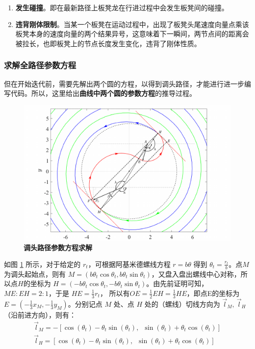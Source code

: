 \documentclass[zihao=-4, UTF8]{article}		%
\theoremstyle{MyLineTheoremStyle} %
\theoremstyle{MyBlockTheoremStyle} %
\theoremstyle{MySubsubsectionStyle} %
\begin{document}
\begin{enumerate}
\item \textbf{发生碰撞}。即在最新路径上板凳龙在行进过程中会发生板凳间的碰撞。
\item \textbf{违背刚体限制}。当某一个板凳在运动过程中，出现了板凳头尾速度向量点乘该板凳本身的速度向量的两个结果异号，这意味着下一瞬间，两节点间的距离会被拉长，也即板凳上的节点长度发生变化，违背了刚体性质。
\end{enumerate}

\subsubsection{求解全路径参数方程}

但在开始迭代前，需要先解出两个圆的方程，以得到调头路径，才能进行进一步编写代码。所以，这里给出\textbf{曲线中两个圆的参数方程}的推导过程。

\begin{figure}[H]
    \centering
    \includegraphics[width=1.0\textwidth]{assets/t4getfunc.pdf}
    \caption{\textbf{调头路径参数方程求解}}
    \label{调头路径参数方程求解}
\end{figure}

如图 \ref*{调头路径参数方程求解} 所示，对于给定的 $r_t$，可根据阿基米德螺线方程 $r=b\theta$ 得到 $\theta_{t}=\frac{r_t}{b}$。点$M$为调头起始点，则有 $M=(b\theta_t\cos{\theta_t},b\theta_t\sin{\theta_t})$，又盘入盘出螺线中心对称，所以点$H$的坐标为 $H=(-b\theta_t\cos{\theta_t},-b\theta_t\sin{\theta_t})$。由先前证明可知，$ME:EH=2:1$，于是 $HE=\frac{1}{3}r_t$，
所以有$OE=\frac{1}{2}EH=\frac{1}{3}HE$，即点E的坐标为 $E=(-\frac{1}{3}x_M, -\frac{1}{3}y_M)$。分别记点 $M$ 处、点 $H$ 处的（螺线）切线方向为 $\vec{l}_M,\ \vec{l}_H$（沿前进方向），则有：
\begin{gather}
    \vec{l}_M=-[\cos{(\theta_t)}-\theta_t\sin{(\theta_t)},\enspace \sin{(\theta_t)}+\theta_t\cos{(\theta_t)}] \\ 
    \vec{l}_H=[\cos{(\theta_t)}-\theta_t\sin{(\theta_t)},\enspace \sin{(\theta_t)}+\theta_t\cos{(\theta_t)}]
\end{gather}
\end{document}
